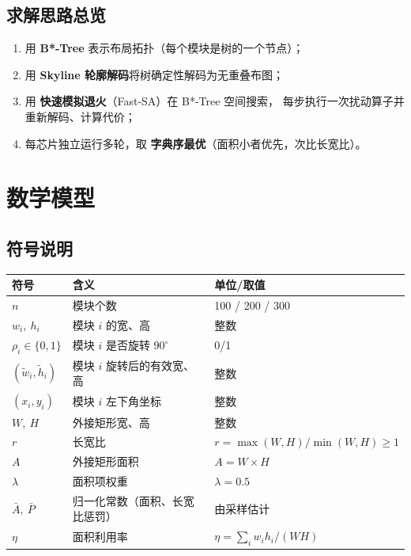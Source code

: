 \documentclass[12pt,a4paper]{article}
\begin{document}
\subsection{求解思路总览}

\begin{tcolorbox}[colback=blue!5, colframe=blue!60, title=算法流程]
\begin{enumerate}
    \item 用 \textbf{B*-Tree} 表示布局拓扑（每个模块是树的一个节点）；
    \item 用 \textbf{Skyline 轮廓解码}将树确定性解码为无重叠布图；
    \item 用 \textbf{快速模拟退火}（Fast-SA）在 B*-Tree 空间搜索，
          每步执行一次扰动算子并重新解码、计算代价；
    \item 每芯片独立运行多轮，取 \textbf{字典序最优}（面积小者优先，次比长宽比）。
\end{enumerate}
\end{tcolorbox}

\section{数学模型}

\subsection{符号说明}

\begin{table}[H]
\centering
\small
\begin{tabular}{lll}
\toprule
符号 & 含义 & 单位/取值 \\
\midrule
$n$ & 模块个数 & 100 / 200 / 300 \\
$w_i,\ h_i$ & 模块 $i$ 的宽、高 & 整数 \\
$\rho_i \in \{0,1\}$ & 模块 $i$ 是否旋转 $90^\circ$ & 0/1 \\
$(\tilde w_i, \tilde h_i)$ & 模块 $i$ 旋转后的有效宽、高 & 整数 \\
$(x_i, y_i)$ & 模块 $i$ 左下角坐标 & 整数 \\
$W,\ H$ & 外接矩形宽、高 & 整数 \\
$r$ & 长宽比 & $r = \max(W,H)/\min(W,H) \ge 1$ \\
$A$ & 外接矩形面积 & $A = W \times H$ \\
$\lambda$ & 面积项权重 & $\lambda = 0.5$ \\
$\bar A,\ \bar P$ & 归一化常数（面积、长宽比惩罚） & 由采样估计 \\
$\eta$ & 面积利用率 & $\eta = \sum_i w_i h_i / (W H)$ \\
\bottomrule
\end{tabular}
\end{table}
\end{document}
